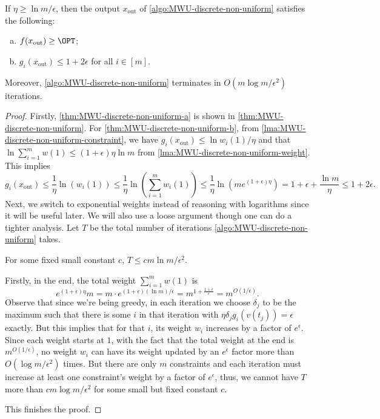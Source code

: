 \begin{theorem}\label{thm:MWU-discrete-non-uniform}
	If \(\eta \geq \ln m / \epsilon \), then the output \(x_{\text{out} }\) of \autoref{algo:MWU-discrete-non-uniform} satisfies the following:
	\begin{enumerate}[(a)]
		\item\label{thm:MWU-discrete-non-uniform-a} \(f(x_{\text{out} }) \geq \OPT\);
		\item\label{thm:MWU-discrete-non-uniform-b} \(g_i(x_{\text{out} }) \leq 1 + 2\epsilon \) for all \(i \in [m]\).
	\end{enumerate}
	Moreover, \autoref{algo:MWU-discrete-non-uniform} terminates in \(O(m \log m / \epsilon ^2)\) iterations.
\end{theorem}
\begin{proof}
	Firstly, \autoref{thm:MWU-discrete-non-uniform-a} is shown in \autoref{thm:MWU-discrete-non-uniform}. For \autoref{thm:MWU-discrete-non-uniform-b}, from \autoref{lma:MWU-discrete-non-uniform-constraint}, we have \(g_i(x_{\text{out} }) \leq \ln w_i(1) / \eta \) and that \(\ln \sum_{i=1}^{m} w(1) \leq (1 + \epsilon ) \eta \ln m\) from \autoref{lma:MWU-discrete-non-uniform-weight}. This implies
	\[
		g_i(x _{\text{out} })
		\leq \frac{1}{\eta } \ln (w_i(1))
		\leq \frac{1}{\eta } \ln (\sum_{i=1}^{m} w_i(1))
		\leq \frac{1}{\eta } \ln (m e^{(1 + \epsilon ) \eta })
		= 1 + \epsilon + \frac{\ln m}{\eta }
		\leq 1 + 2\epsilon .
	\]
	Next, we switch to exponential weights instead of reasoning with logarithms since it will be useful later. We will also use a loose argument though one can do a tighter analysis. Let \(T\) be the total number of iterations \autoref{algo:MWU-discrete-non-uniform} takes.

	\begin{claim}
		For some fixed small constant \(c\), \(T \leq c m \ln m / \epsilon ^2\).
	\end{claim}
	\begin{explanation}
		Firstly, in the end, the total weight \(\sum_{i=1}^{m} w(1)\) is
		\[
			e^{(1 + \epsilon ) \eta }m
			= m \cdot e^{(1 + \epsilon ) (\ln m) / \epsilon }
			= m^{1 + \frac{1 + \epsilon }{\epsilon }}
			= m^{O(1 / \epsilon )}.
		\]
		Observe that since we're being greedy, in each iteration we choose \(\delta _j\) to be the maximum such that there is some \(i\) in that iteration with \(\eta \delta _j g_i(v(t_j)) = \epsilon \) exactly. But this implies that for that \(i\), its weight \(w_i\) increases by a factor of \(e^{\epsilon } \). Since each weight starts at \(1\), with the fact that the total weight at the end is \(m^{O(1 / \epsilon )}\), no weight \(w_i\) can have its weight updated by an \(e^{\epsilon } \) factor more than \(O(\log m / \epsilon ^2)\) times. But there are only \(m\) constraints and each iteration must increase at least one constraint's weight by a factor of \(e^{\epsilon } \), thus, we cannot have \(T\) more than \(cm \log m / \epsilon ^2\) for some small but fixed constant \(c\).
	\end{explanation}
	This finishes the proof.
\end{proof}

